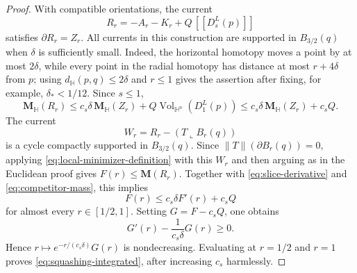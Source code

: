 \documentclass[10pt,a4paper]{amsart}
\newcommand{\Hyp}{\mathbb H}
\newcommand{\Mass}{\mathbf M}
\newcommand{\cur}[1]{\left[\!\left[#1\right]\!\right]}
\newcommand{\restr}{\mathbin{\llcorner}}
\begin{document}
\begin{proof}
With compatible orientations, the current
\[
 R_r=-A_r-K_r+Q\,\cur{D_s^L(p)}
\]
satisfies $\partial R_r=Z_r$.  All currents in this construction are
supported in $B_{3/2}(q)$ when $\delta$ is sufficiently small.  Indeed,
the horizontal homotopy moves a point by at most $2\delta$, while every
point in the radial homotopy has distance at most $r+4\delta$ from $p$;
using $d_{\Hyp}(p,q)\le2\delta$ and $r\le1$ gives the assertion after fixing,
for example, $\delta_*<1/12$.  Since
$s\le1$,
\begin{equation}\label{eq:competitor-mass}
 \Mass_{\Hyp}(R_r)
 \le c_s\delta\,\Mass_{\Hyp}(Z_r)
     +Q\operatorname{Vol}_{\Hyp^n}(D_1^L(p))
 \le c_s\delta\,\Mass_{\Hyp}(Z_r)+c_sQ.
\end{equation}
The current
\[
 W_r=R_r-(T\restr B_r(q))
\]
is a cycle compactly supported in $B_{3/2}(q)$.  Since
$\|T\|(\partial B_r(q))=0$, applying
\eqref{eq:local-minimizer-definition} with this $W_r$ and then arguing as in
the Euclidean proof gives $F(r)\le\Mass(R_r)$.  Together with
\eqref{eq:slice-derivative} and
\eqref{eq:competitor-mass}, this implies
\begin{equation}\label{eq:differential-squashing}
 F(r)\le c_s\delta F'(r)+c_sQ
\end{equation}
for almost every $r\in[1/2,1]$.  Setting $G=F-c_sQ$, one obtains
\[
 G'(r)-\frac{1}{c_s\delta}G(r)\ge0.
\]
Hence $r\mapsto e^{-r/(c_s\delta)}G(r)$ is nondecreasing.  Evaluating at
$r=1/2$ and $r=1$ proves \eqref{eq:squashing-integrated}, after increasing
$c_s$ harmlessly.
\end{proof}
\end{document}

